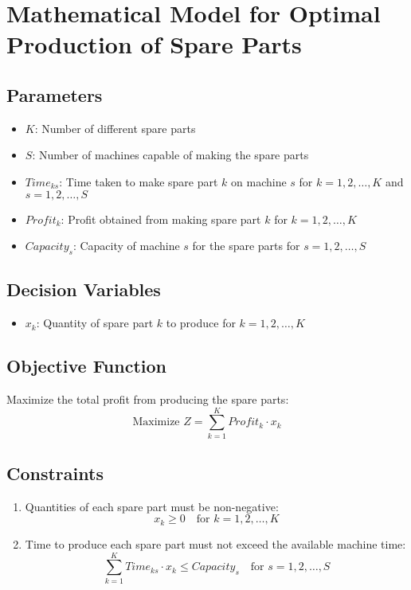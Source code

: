 \documentclass{article}
\begin{document}
\section*{Mathematical Model for Optimal Production of Spare Parts}

\subsection*{Parameters}
\begin{itemize}
    \item $K$: Number of different spare parts
    \item $S$: Number of machines capable of making the spare parts
    \item $Time_{ks}$: Time taken to make spare part $k$ on machine $s$ for $k = 1, 2, \ldots, K$ and $s = 1, 2, \ldots, S$
    \item $Profit_k$: Profit obtained from making spare part $k$ for $k = 1, 2, \ldots, K$
    \item $Capacity_s$: Capacity of machine $s$ for the spare parts for $s = 1, 2, \ldots, S$
\end{itemize}

\subsection*{Decision Variables}
\begin{itemize}
    \item $x_k$: Quantity of spare part $k$ to produce for $k = 1, 2, \ldots, K$
\end{itemize}

\subsection*{Objective Function}
Maximize the total profit from producing the spare parts:
\[
\text{Maximize } Z = \sum_{k=1}^{K} Profit_k \cdot x_k
\]

\subsection*{Constraints}
\begin{enumerate}
    \item Quantities of each spare part must be non-negative:
    \[
    x_k \geq 0 \quad \text{for } k = 1, 2, \ldots, K
    \]
    
    \item Time to produce each spare part must not exceed the available machine time:
    \[
    \sum_{k=1}^{K} Time_{ks} \cdot x_k \leq Capacity_s \quad \text{for } s = 1, 2, \ldots, S
    \]
\end{enumerate}
\end{document}
